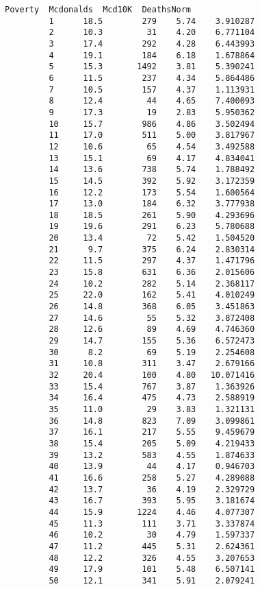 \documentclass[11pt]{article}
\begin{document}
\begin{Verbatim}[commandchars=\\\{\}]
             Poverty  Mcdonalds  Mcd10K  DeathsNorm  
         1      18.5        279    5.74    3.910287  
         2      10.3         31    4.20    6.771104  
         3      17.4        292    4.28    6.443993  
         4      19.1        184    6.18    1.678864  
         5      15.3       1492    3.81    5.390241  
         6      11.5        237    4.34    5.864486  
         7      10.5        157    4.37    1.113931  
         8      12.4         44    4.65    7.400093  
         9      17.3         19    2.83    5.950362  
         10     15.7        986    4.86    3.502494  
         11     17.0        511    5.00    3.817967  
         12     10.6         65    4.54    3.492588  
         13     15.1         69    4.17    4.834041  
         14     13.6        738    5.74    1.788492  
         15     14.5        392    5.92    3.172359  
         16     12.2        173    5.54    1.600564  
         17     13.0        184    6.32    3.777938  
         18     18.5        261    5.90    4.293696  
         19     19.6        291    6.23    5.780688  
         20     13.4         72    5.42    1.504520  
         21      9.7        375    6.24    2.830314  
         22     11.5        297    4.37    1.471796  
         23     15.8        631    6.36    2.015606  
         24     10.2        282    5.14    2.368117  
         25     22.0        162    5.41    4.010249  
         26     14.8        368    6.05    3.451863  
         27     14.6         55    5.32    3.872408  
         28     12.6         89    4.69    4.746360  
         29     14.7        155    5.36    6.572473  
         30      8.2         69    5.19    2.254608  
         31     10.8        311    3.47    2.679166  
         32     20.4        100    4.80   10.071416  
         33     15.4        767    3.87    1.363926  
         34     16.4        475    4.73    2.588919  
         35     11.0         29    3.83    1.321131  
         36     14.8        823    7.09    3.099861  
         37     16.1        217    5.55    9.459679  
         38     15.4        205    5.09    4.219433  
         39     13.2        583    4.55    1.874633  
         40     13.9         44    4.17    0.946703  
         41     16.6        258    5.27    4.289088  
         42     13.7         36    4.19    2.329729  
         43     16.7        393    5.95    3.181674  
         44     15.9       1224    4.46    4.077307  
         45     11.3        111    3.71    3.337874  
         46     10.2         30    4.79    1.597337  
         47     11.2        445    5.31    2.624361  
         48     12.2        326    4.55    3.207653  
         49     17.9        101    5.48    6.507141  
         50     12.1        341    5.91    2.079241  
\end{Verbatim}
            
\end{document}

